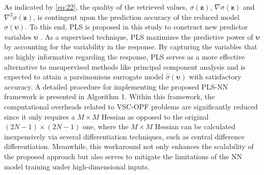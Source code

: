 \documentclass[journal]{IEEEtran}
\theoremstyle{definition}
\theoremstyle{remark}
\begin{document}
As indicated by \eqref{eq:22}, the quality of the retrieved values, $\sigma(\boldsymbol{z})$, $\nabla \sigma(\boldsymbol{z})$ and $\nabla^2 \sigma(\boldsymbol{z})$, is contingent upon the prediction accuracy of the reduced model $\hat{\sigma}(\boldsymbol{\upsilon})$. To this end, PLS is proposed in this study to construct new predictor variables $\boldsymbol{\upsilon}$ \cite{de1993simpls}. As a supervised technique, PLS maximizes the predictive power of $\boldsymbol{\upsilon}$ by accounting for the variability in the response. By capturing the variables that are highly informative regarding the response, PLS serves as a more effective alternative to unsupervised methods like principal component analysis and is expected to attain a parsimonious surrogate model $\hat{\sigma}(\boldsymbol{\upsilon})$ with satisfactory accuracy. 
A detailed procedure for implementing the proposed PLS-NN framework is presented in Algorithm 1. Within this framework, the computational overheads related to VSC-OPF problems are significantly reduced since it only requires a $M \times M$ Hessian as opposed to the original $(2N-1)\times (2N-1)$ one, where the $M \times M$ Hessian can be calculated inexpensively via several differentiation techniques, such as central difference differentiation. Meanwhile, this workaround not only enhances the scalability of the proposed approach but also serves to mitigate the limitations of the NN model training under high-dimensional inputs.
\end{document}
